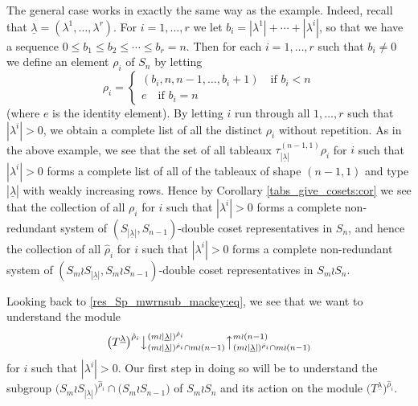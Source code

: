 \documentclass[ALCO,Unicode,published]{cedram}
\newcommand{\ul}[1]{\underline{#1}}
\begin{document}
The general case works in exactly the same way as the example. Indeed, recall that $\ul{\lambda} = (\lambda^1,\ldots,\lambda^r)$. For
$i=1,\ldots,r$ we let $b_i = |\lambda^1|+\cdots+|\lambda^i|$, so that we have a sequence $0 \leq b_1 \leq b_2 \leq \cdots \leq b_r = n$.
Then for each $i=1,\ldots,r$ such that $b_i \neq 0$ we define an element $\rho_i$ of $S_n$ by letting
\[
\rho_i = \begin{cases}
(b_i,n,n-1,\ldots,b_i+1) \quad\text{if $b_i < n$}\\
e \quad\text{if $b_i = n$}
\end{cases}
\]
(where $e$ is the identity element). By letting $i$ run through all $1,\ldots,r$ such that $|\lambda^i| > 0$, we obtain a complete list
of all the distinct $\rho_i$ without repetition. As in the above example, we see that the set of all tableaux
$\tau^{(n-1,1)}_{|\ul{\lambda}|}\rho_i$ for $i$ such that $|\lambda^i| > 0$ forms a complete list of all of the tableaux of shape $(n-1,1)$
and type $|\ul{\lambda}|$ with weakly increasing rows. Hence by Corollary \ref{tabs_give_cosets:cor} we see that the collection of all
$\rho_i$ for $i$ such that $|\lambda^i| > 0$ forms a complete non-redundant system of $(S_{|\ul{\lambda}|},S_{n-1})$-double coset
representatives in $S_n$, and hence the collection of all $\hat\rho_i$ for $i$ such that $|\lambda^i| > 0$ forms a complete non-redundant
system of $(S_m \wr S_{|\ul{\lambda}|},S_m \wr S_{n-1})$-double coset representatives in $S_m \wr S_n$.

Looking back to \eqref{res_Sp_mwrnsub_mackey:eq}, we see that we want to understand the module
\[
\bigl(T^{\ul{\lambda}}\bigr)^{\hat\rho_i}\bigl\downarrow^{(m{\wr}|\ul{\lambda}|)^{\hat\rho_i}}_{(m{\wr}|\ul{\lambda}|)^{\hat\rho_i} \cap m \wr (n-1)}
\bigl\uparrow^{m \wr (n-1)}_{(m{\wr}|\ul{\lambda}|)^{\hat\rho_i} \cap m \wr (n-1)}
\]
for $i$ such that $|\lambda^i|>0$. Our first step in doing so will be to understand the subgroup
$\bigl(S_m \wr S_{|\ul{\lambda}|}\bigr)^{\hat\rho_i}\cap\bigl(S_m \wr S_{n-1}\bigr)$ of $S_m \wr S_n$ and its action on the module
$\bigl(T^{\ul{\lambda}}\bigr)^{\hat\rho_i}$.
\end{document}
